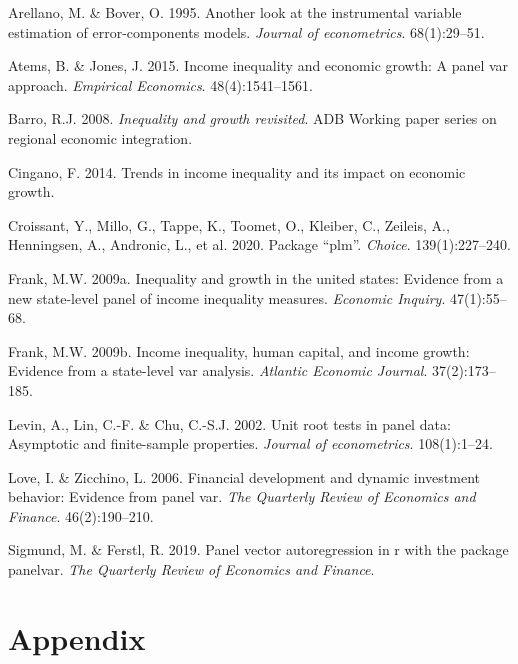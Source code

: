 \documentclass[11pt,preprint, authoryear]{elsarticle}
\numberwithin{equation}{section}
\numberwithin{figure}{section}
\numberwithin{table}{section}
\begin{document}
\hypertarget{refs}{}
\leavevmode\hypertarget{ref-arellano}{}%
Arellano, M. \& Bover, O. 1995. Another look at the instrumental
variable estimation of error-components models. \emph{Journal of
econometrics}. 68(1):29--51.

\leavevmode\hypertarget{ref-atems}{}%
Atems, B. \& Jones, J. 2015. Income inequality and economic growth: A
panel var approach. \emph{Empirical Economics}. 48(4):1541--1561.

\leavevmode\hypertarget{ref-barro}{}%
Barro, R.J. 2008. \emph{Inequality and growth revisited}. ADB Working
paper series on regional economic integration.

\leavevmode\hypertarget{ref-cingano}{}%
Cingano, F. 2014. Trends in income inequality and its impact on economic
growth.

\leavevmode\hypertarget{ref-croissant2020package}{}%
Croissant, Y., Millo, G., Tappe, K., Toomet, O., Kleiber, C., Zeileis,
A., Henningsen, A., Andronic, L., et al. 2020. Package ``plm''.
\emph{Choice}. 139(1):227--240.

\leavevmode\hypertarget{ref-frank}{}%
Frank, M.W. 2009a. Inequality and growth in the united states: Evidence
from a new state-level panel of income inequality measures.
\emph{Economic Inquiry}. 47(1):55--68.

\leavevmode\hypertarget{ref-frankincome}{}%
Frank, M.W. 2009b. Income inequality, human capital, and income growth:
Evidence from a state-level var analysis. \emph{Atlantic Economic
Journal}. 37(2):173--185.

\leavevmode\hypertarget{ref-levin}{}%
Levin, A., Lin, C.-F. \& Chu, C.-S.J. 2002. Unit root tests in panel
data: Asymptotic and finite-sample properties. \emph{Journal of
econometrics}. 108(1):1--24.

\leavevmode\hypertarget{ref-love}{}%
Love, I. \& Zicchino, L. 2006. Financial development and dynamic
investment behavior: Evidence from panel var. \emph{The Quarterly Review
of Economics and Finance}. 46(2):190--210.

\leavevmode\hypertarget{ref-sigmund2019panel}{}%
Sigmund, M. \& Ferstl, R. 2019. Panel vector autoregression in r with
the package panelvar. \emph{The Quarterly Review of Economics and
Finance}.

\newpage

\hypertarget{appendix}{%
\section*{Appendix}\label{appendix}}
\end{document}
